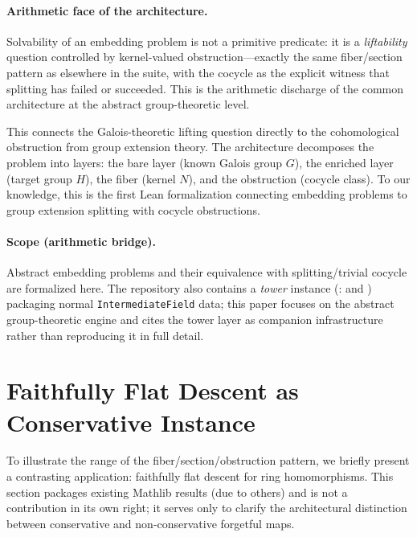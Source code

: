 \documentclass[11pt]{article}
\newcommand{\lean}[1]{\texttt{#1}}
\begin{document}
\paragraph{Arithmetic face of the architecture.}
Solvability of an embedding problem is not a primitive predicate: it is a \emph{liftability}
question controlled by kernel-valued obstruction---exactly the same fiber/section pattern as
elsewhere in the suite, with the cocycle as the explicit witness that splitting has failed or
succeeded. This is the arithmetic discharge of the common architecture at the abstract
group-theoretic level.

\noindent
This connects the Galois-theoretic lifting question directly to the cohomological
obstruction from group extension theory. The architecture decomposes the problem
into layers: the bare layer (known Galois group $G$), the enriched layer (target
group $H$), the fiber (kernel $N$), and the obstruction (cocycle class). To our
knowledge, this is the first Lean formalization connecting embedding problems to
group extension splitting with cocycle obstructions.

\paragraph{Scope (arithmetic bridge).}
Abstract embedding problems and their equivalence with splitting/trivial cocycle are
formalized here. The repository also contains a \emph{tower} instance
(:  and\linebreak
{}) packaging normal
\lean{IntermediateField} data; this paper focuses on the abstract group-theoretic engine and
cites the tower layer as companion infrastructure rather than reproducing it in full detail.

\section{Faithfully Flat Descent as Conservative Instance}\label{sec:descent}

To illustrate the range of the fiber/section/obstruction pattern, we briefly
present a contrasting application: faithfully flat descent for ring homomorphisms.
This section packages existing Mathlib results (due to others) and is not a
contribution in its own right; it serves only to clarify the architectural
distinction between conservative and non-conservative forgetful maps.
\end{document}

